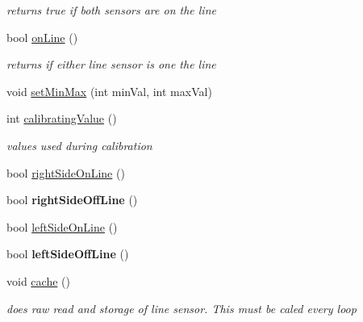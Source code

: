 \begin{DoxyCompactItemize}
\begin{DoxyCompactList}\small\item\em returns true if both sensors are on the line \end{DoxyCompactList}\item 
\hypertarget{classLineSensor_ad9d3c5a694f1ff946d1137df1694b026}{bool \hyperlink{classLineSensor_ad9d3c5a694f1ff946d1137df1694b026}{on\-Line} ()}\label{classLineSensor_ad9d3c5a694f1ff946d1137df1694b026}

\begin{DoxyCompactList}\small\item\em returns if either line sensor is one the line \end{DoxyCompactList}\item 
void \hyperlink{classLineSensor_a1c76fb6ddfea2243b6bb3a61015f8b59}{set\-Min\-Max} (int min\-Val, int max\-Val)
\item 
\hypertarget{classLineSensor_a51eeba9a7b0f56a69a0157f6f576495f}{int \hyperlink{classLineSensor_a51eeba9a7b0f56a69a0157f6f576495f}{calibrating\-Value} ()}\label{classLineSensor_a51eeba9a7b0f56a69a0157f6f576495f}

\begin{DoxyCompactList}\small\item\em values used during calibration \end{DoxyCompactList}\item 
bool \hyperlink{classLineSensor_a92c8d91032dcba0860007e6d7248329f}{right\-Side\-On\-Line} ()
\item 
\hypertarget{classLineSensor_a045f589ecb0f76c596cba7d78e43233d}{bool {\bfseries right\-Side\-Off\-Line} ()}\label{classLineSensor_a045f589ecb0f76c596cba7d78e43233d}

\item 
bool \hyperlink{classLineSensor_a59fdc7f06ce311ccef3ed99f005830fa}{left\-Side\-On\-Line} ()
\item 
\hypertarget{classLineSensor_a7b0c24dd32db9739ff90f790ae99981f}{bool {\bfseries left\-Side\-Off\-Line} ()}\label{classLineSensor_a7b0c24dd32db9739ff90f790ae99981f}

\item 
\hypertarget{classLineSensor_afc809d2aa49426d949f76f68b0154050}{void \hyperlink{classLineSensor_afc809d2aa49426d949f76f68b0154050}{cache} ()}\label{classLineSensor_afc809d2aa49426d949f76f68b0154050}

\begin{DoxyCompactList}\small\item\em does raw read and storage of line sensor. This must be caled every loop \end{DoxyCompactList}\end{DoxyCompactItemize}


